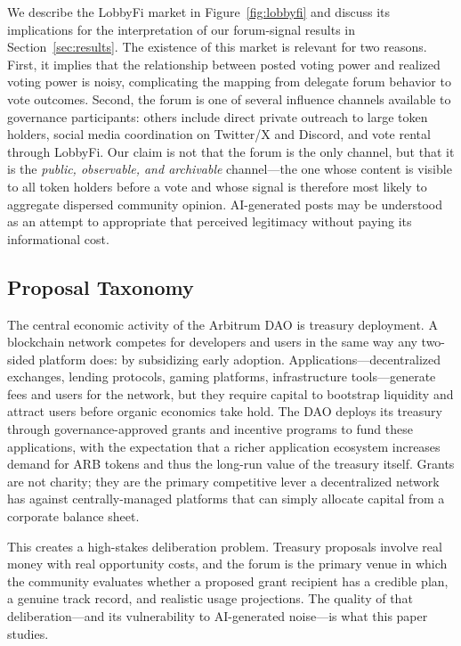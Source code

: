\documentclass[12pt]{article}
\begin{document}
We describe the LobbyFi market in Figure~\ref{fig:lobbyfi} and discuss its
implications for the interpretation of our forum-signal results in
Section~\ref{sec:results}. The existence of this market is relevant for two
reasons. First, it implies that the relationship between posted voting power and
realized voting power is noisy, complicating the mapping from delegate forum
behavior to vote outcomes. Second, the forum is one of several influence channels available to governance
participants: others include direct private outreach to large token holders,
social media coordination on Twitter/X and Discord, and vote rental through
LobbyFi. Our claim is not that the forum is the only channel, but that it is the
\emph{public, observable, and archivable} channel---the one whose content is
visible to all token holders before a vote and whose signal is therefore most
likely to aggregate dispersed community opinion. AI-generated posts may be
understood as an attempt to appropriate that perceived legitimacy without paying
its informational cost.

\subsection{Proposal Taxonomy}

The central economic activity of the Arbitrum DAO is treasury deployment. A blockchain
network competes for developers and users in the same way any two-sided platform does:
by subsidizing early adoption. Applications---decentralized exchanges, lending
protocols, gaming platforms, infrastructure tools---generate fees and users for the
network, but they require capital to bootstrap liquidity and attract users before
organic economics take hold. The DAO deploys its treasury through governance-approved
grants and incentive programs to fund these applications, with the expectation that
a richer application ecosystem increases demand for ARB tokens and thus the long-run
value of the treasury itself. Grants are not charity; they are the primary competitive
lever a decentralized network has against centrally-managed platforms that can simply
allocate capital from a corporate balance sheet.

This creates a high-stakes deliberation problem. Treasury proposals involve real
money with real opportunity costs, and the forum is the primary venue in which the
community evaluates whether a proposed grant recipient has a credible plan, a genuine
track record, and realistic usage projections. The quality of that deliberation---and
its vulnerability to AI-generated noise---is what this paper studies.
\end{document}
